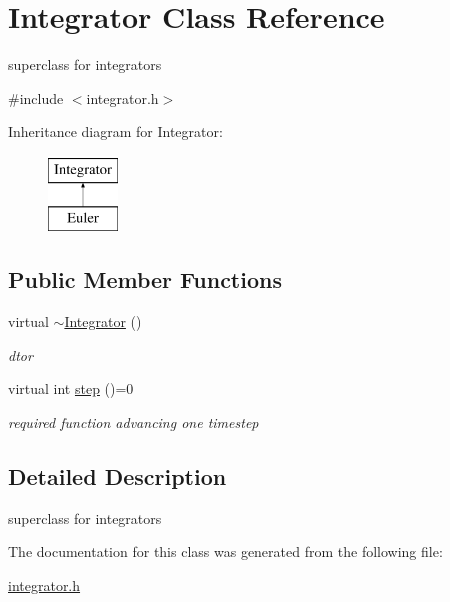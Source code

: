 \hypertarget{classIntegrator}{\section{\-Integrator \-Class \-Reference}
\label{classIntegrator}
}


superclass for integrators  




{\ttfamily \#include $<$integrator.\-h$>$}

\-Inheritance diagram for \-Integrator\-:\begin{figure}[H]
\begin{center}
\leavevmode
\includegraphics[height=2.000000cm]{classIntegrator}
\end{center}
\end{figure}
\subsection*{\-Public \-Member \-Functions}
\begin{DoxyCompactItemize}
\item 
\hypertarget{classIntegrator_ada0ac381fb6d891c8074fd1ed2102229}{virtual \hyperlink{classIntegrator_ada0ac381fb6d891c8074fd1ed2102229}{$\sim$\-Integrator} ()}\label{classIntegrator_ada0ac381fb6d891c8074fd1ed2102229}

\begin{DoxyCompactList}\small\item\em dtor \end{DoxyCompactList}\item 
\hypertarget{classIntegrator_a453bb8d88d3e35e6212bb43d61ef7253}{virtual int \hyperlink{classIntegrator_a453bb8d88d3e35e6212bb43d61ef7253}{step} ()=0}\label{classIntegrator_a453bb8d88d3e35e6212bb43d61ef7253}

\begin{DoxyCompactList}\small\item\em required function advancing one timestep \end{DoxyCompactList}\end{DoxyCompactItemize}


\subsection{\-Detailed \-Description}
superclass for integrators 

\-The documentation for this class was generated from the following file\-:\begin{DoxyCompactItemize}
\item 
\hyperlink{integrator_8h}{integrator.\-h}\end{DoxyCompactItemize}
